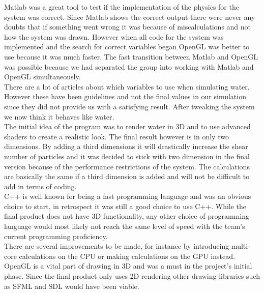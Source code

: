 \documentclass[a4paper,12pt,twoside,final]{report}
\begin{document}
Matlab was a great tool to test if the implementation of the physics for the system was correct. Since Matlab shows the correct output there were never any doubts that if something went wrong it was because of miscalculations and not how the system was drawn. However when all code for the system was implemented and the search for correct variables began OpenGL was better to use because it was much faster. The fast transition between Matlab and OpenGL was possible because we had separated the group into working with Matlab and OpenGL simultaneously. \\

\noindent There are a lot of articles about which variables to use when simulating water. However these have been guidelines and not the final values in our simulation since they did not provide us with a satisfying result. After tweaking the system we now think it behaves like water. \\

\noindent The initial idea of the program was to render water in 3D and to use advanced shaders to create a realistic look. The final result however is in only two dimensions. By adding a third dimensions it will drastically increase the shear number of particles and it was decided to stick with two dimension in the final version because of the performance restrictions of the system. The calculations are basically the same if a third dimension is added and will not be difficult to add in terms of coding. \\

\noindent C++ is well known for being a fast programming language and was an obvious choice to start, in retrospect it was still a good choice to use C++. While the final product does not have 3D functionality, any other choice of programming language would most likely not reach the same level of speed with the team’s current programming proficiency. \\

\noindent There are several improvements to be made, for instance by introducing multi-core calculations on the CPU or making calculations on the GPU instead. OpenGL is a vital part of drawing in 3D and was a must in the project’s initial phase. Since the final product only uses 2D rendering other drawing libraries such as SFML and SDL would have been viable.




\end{document}
